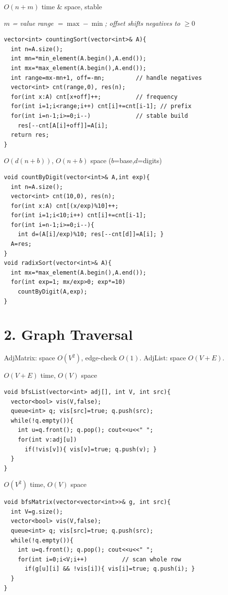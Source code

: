 \documentclass[12pt,landscape,a4paper]{extarticle}
\newcommand{\algo}[2]{\vspace{1pt}{\bfseries #1}\hfill{\footnotesize\color{cx}#2}\par\vspace{-1pt}}
\newcommand{\note}[1]{{\footnotesize\itshape #1}\par}
\begin{document}
\begin{multicols}{2}
\algo{Counting Sort (negative-safe)}{$O(n+m)$ time \& space, stable}
\note{$m$ = value range $=\max-\min$; offset shifts negatives to $\ge 0$}
\begin{lstlisting}
vector<int> countingSort(vector<int>& A){
  int n=A.size();
  int mn=*min_element(A.begin(),A.end());
  int mx=*max_element(A.begin(),A.end());
  int range=mx-mn+1, off=-mn;         // handle negatives
  vector<int> cnt(range,0), res(n);
  for(int x:A) cnt[x+off]++;          // frequency
  for(int i=1;i<range;i++) cnt[i]+=cnt[i-1]; // prefix
  for(int i=n-1;i>=0;i--)             // stable build
    res[--cnt[A[i]+off]]=A[i];
  return res;
}
\end{lstlisting}

\algo{Radix Sort}{$O(d(n+b))$, $O(n+b)$ space ($b$=base,$d$=digits)}
\begin{lstlisting}
void countByDigit(vector<int>& A,int exp){
  int n=A.size();
  vector<int> cnt(10,0), res(n);
  for(int x:A) cnt[(x/exp)%10]++;
  for(int i=1;i<10;i++) cnt[i]+=cnt[i-1];
  for(int i=n-1;i>=0;i--){
    int d=(A[i]/exp)%10; res[--cnt[d]]=A[i]; }
  A=res;
}
void radixSort(vector<int>& A){
  int mx=*max_element(A.begin(),A.end());
  for(int exp=1; mx/exp>0; exp*=10)
    countByDigit(A,exp);
}
\end{lstlisting}

\section*{2. Graph Traversal}
{\footnotesize AdjMatrix: space $O(V^2)$, edge-check $O(1)$. AdjList: space $O(V{+}E)$.}

\algo{BFS --- Adjacency List}{$O(V+E)$ time, $O(V)$ space}
\begin{lstlisting}
void bfsList(vector<int> adj[], int V, int src){
  vector<bool> vis(V,false);
  queue<int> q; vis[src]=true; q.push(src);
  while(!q.empty()){
    int u=q.front(); q.pop(); cout<<u<<" ";
    for(int v:adj[u])
      if(!vis[v]){ vis[v]=true; q.push(v); }
  }
}
\end{lstlisting}

\algo{BFS --- Adjacency Matrix}{$O(V^2)$ time, $O(V)$ space}
\begin{lstlisting}
void bfsMatrix(vector<vector<int>>& g, int src){
  int V=g.size();
  vector<bool> vis(V,false);
  queue<int> q; vis[src]=true; q.push(src);
  while(!q.empty()){
    int u=q.front(); q.pop(); cout<<u<<" ";
    for(int i=0;i<V;i++)          // scan whole row
      if(g[u][i] && !vis[i]){ vis[i]=true; q.push(i); }
  }
}
\end{lstlisting}


\end{multicols}
\end{document}
